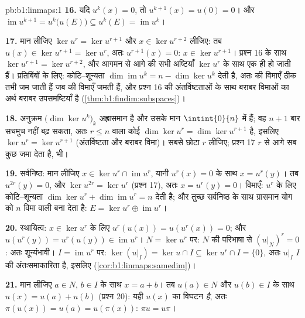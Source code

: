 \begin{solution}{pb:b1:linmaps:1}
\textbf{16.} यदि $u^k(x) = 0$, तो $u^{k+1}(x) = u(0) = 0$। और
$\operatorname{im} u^{k+1} = u^k\bigl(u(E)\bigr) \subseteq u^k(E) =
\operatorname{im} u^k$।

\textbf{17.} मान लीजिए $\ker u^{r} = \ker u^{r+1}$ और $x \in \ker u^{r+2}$
लीजिए: तब $u(x) \in \ker u^{r+1} = \ker u^{r}$, अतः $u^{r+1}(x) = 0$: $x \in
\ker u^{r+1}$। प्रश्न 16 के साथ $\ker u^{r+1} = \ker u^{r+2}$, और आगमन से
आगे की सभी अष्टियाँ $\ker u^{r}$ के साथ एक ही हो जाती हैं। प्रतिबिंबों के
लिए: कोटि--शून्यता $\dim\operatorname{im} u^k = n - \dim\ker u^k$ देती है,
अतः  की विमाएँ ठीक तभी जम जाती हैं जब  की विमाएँ जमती हैं, और
प्रश्न 16 की अंतर्विष्टताओं के साथ बराबर विमाओं का अर्थ बराबर उपसमष्टियाँ है
(\cref{thm:b1:findim:subspaces})।

\textbf{18.} अनुक्रम $\bigl(\dim\ker u^k\bigr)_k$ अह्रासमान है और उसके मान
$\intint{0}{n}$ में हैं; वह $n + 1$ बार सचमुच नहीं बढ़ सकता, अतः $r \leq n$
वाला कोई $\dim\ker u^{r} = \dim\ker u^{r+1}$ है, इसलिए $\ker u^{r} = \ker
u^{r+1}$ (अंतर्विष्टता और बराबर विमा)। सबसे छोटा $r$ लीजिए; प्रश्न 17 $r$ से
आगे सब कुछ जमा देता है,  भी।

\textbf{19.} सर्वनिष्ठ: मान लीजिए $x \in \ker u^{r} \cap \operatorname{im}
u^{r}$, यानी $u^{r}(x) = 0$ के साथ $x = u^{r}(y)$। तब $u^{2r}(y) = 0$, और
$\ker u^{2r} = \ker u^{r}$ (प्रश्न 17), अतः $x = u^{r}(y) = 0$। विमाएँ:
$u^{r}$ के लिए कोटि--शून्यता $\dim\ker u^{r} + \dim\operatorname{im} u^{r} =
n$ देती है; और तुच्छ सर्वनिष्ठ के साथ ग्रासमान योग को $n$ विमा वाली 
बना देता है: $E = \ker u^{r} \oplus \operatorname{im} u^{r}$।

\textbf{20.} स्थायित्व: $x \in \ker u^{r}$ के लिए $u^{r}(u(x)) = u(u^{r}(x))
= 0$; और $u(u^{r}(y)) = u^{r}(u(y)) \in \operatorname{im} u^{r}$। $N = \ker
u^{r}$ पर: $N$ की परिभाषा से $(u|_N)^{r} = 0$: अतः शून्यंभावी। $I =
\operatorname{im} u^{r}$ पर: $\ker(u|_I) = \ker u \cap I \subseteq \ker
u^{r} \cap I = \{0\}$, अतः $u|_I$  $I$ की  अंतःसमाकारिता
है, इसलिए  (\cref{cor:b1:linmaps:samedim})।

\textbf{21.} मान लीजिए $a \in N$, $b \in I$ के साथ $x = a + b$। तब $u(a) \in
N$ और $u(b) \in I$ के साथ $u(x) = u(a) + u(b)$ (प्रश्न 20): यही $u(x)$ का
विघटन \emph{है}, अतः $\pi(u(x)) = u(a) = u(\pi(x))$: $\pi u = u\pi$।


\end{solution}

